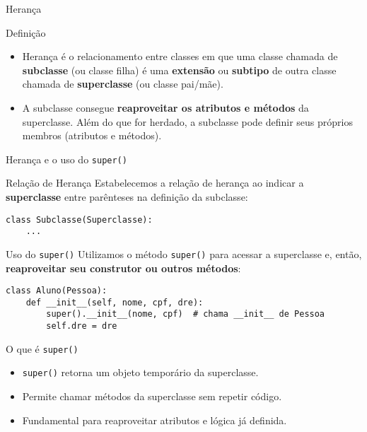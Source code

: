 \begin{frame}{Herança}

\begin{block}{Definição}
\begin{itemize}
    \item Herança é o relacionamento entre classes em que uma classe chamada de 
\textbf{subclasse} (ou classe filha) é uma \textbf{extensão} ou \textbf{subtipo} 
de outra classe chamada de \textbf{superclasse} (ou classe pai/mãe).

\item A subclasse consegue \textbf{reaproveitar os atributos e métodos} da superclasse. 
Além do que for herdado, a subclasse pode definir seus próprios membros 
(atributos e métodos).
\end{itemize}


\end{block}

\end{frame}

\begin{frame}[fragile]{Herança e o uso do \texttt{super()}}

\begin{block}{Relação de Herança}
Estabelecemos a relação de herança ao indicar a \textbf{superclasse} entre parênteses na definição da subclasse:

\begin{verbatim}
class Subclasse(Superclasse):
    ...
\end{verbatim}
\end{block}

\begin{block}{Uso do \texttt{super()}}
Utilizamos o método \texttt{super()} para acessar a superclasse e, então, \textbf{reaproveitar seu construtor ou outros métodos}:

\begin{verbatim}
class Aluno(Pessoa):
    def __init__(self, nome, cpf, dre):
        super().__init__(nome, cpf)  # chama __init__ de Pessoa
        self.dre = dre
\end{verbatim}
\end{block}

\end{frame}

\begin{frame}[fragile]{O que é \texttt{super()}}
\begin{itemize}
    \item \texttt{super()} retorna um objeto temporário da superclasse.
    \item Permite chamar métodos da superclasse sem repetir código.
    \item Fundamental para reaproveitar atributos e lógica já definida.
\end{itemize}

\end{frame}



